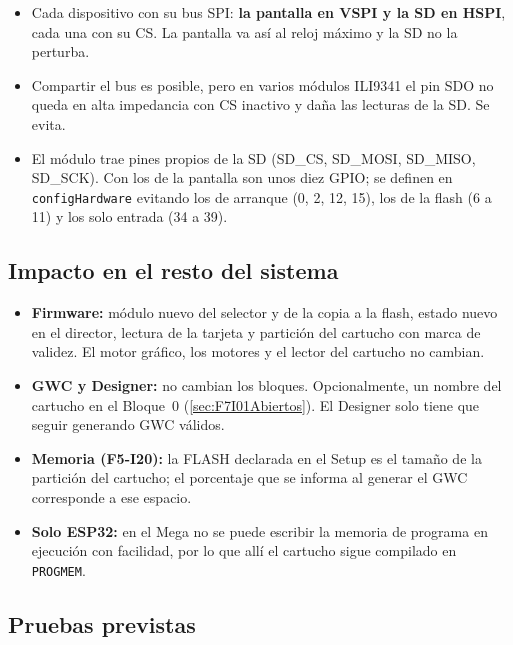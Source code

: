 \begin{itemize}
	\item Cada dispositivo con su bus SPI: \textbf{la pantalla en VSPI y la SD en HSPI}, cada una con su CS. La pantalla va así al reloj máximo y la SD no la perturba.
	\item Compartir el bus es posible, pero en varios módulos ILI9341 el pin SDO no queda en alta impedancia con CS inactivo y daña las lecturas de la SD. Se evita.
	\item El módulo trae pines propios de la SD (SD\_CS, SD\_MOSI, SD\_MISO, SD\_SCK). Con los de la pantalla son unos diez GPIO; se definen en \texttt{configHardware} evitando los de arranque (0, 2, 12, 15), los de la flash (6 a 11) y los solo entrada (34 a 39).
\end{itemize}

\subsection{Impacto en el resto del sistema}
\label{sec:F7I01Impacto}

\begin{itemize}
	\item \textbf{Firmware:} módulo nuevo del selector y de la copia a la flash, estado nuevo en el director, lectura de la tarjeta y partición del cartucho con marca de validez. El motor gráfico, los motores y el lector del cartucho no cambian.
	\item \textbf{GWC y Designer:} no cambian los bloques. Opcionalmente, un nombre del cartucho en el Bloque~0 (\ref{sec:F7I01Abiertos}). El Designer solo tiene que seguir generando GWC válidos.
	\item \textbf{Memoria (F5-I20):} la FLASH declarada en el Setup es el tamaño de la partición del cartucho; el porcentaje que se informa al generar el GWC corresponde a ese espacio.
	\item \textbf{Solo ESP32:} en el Mega no se puede escribir la memoria de programa en ejecución con facilidad, por lo que allí el cartucho sigue compilado en \texttt{PROGMEM}.
\end{itemize}

\subsection{Pruebas previstas}
\label{sec:F7I01Pruebas}

